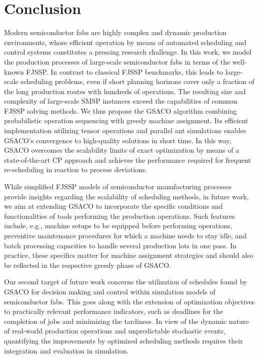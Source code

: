 \documentclass[runningheads]{llncs}
\begin{document}
\section{Conclusion}
\label{sec:conclusion}

Modern semiconductor fabs are highly complex and dynamic production
environments, whose efficient operation by means of automated scheduling
and control systems constitutes a pressing research challenge.
In this work, we model the production processes of large-scale
semiconductor fabs in terms of the well-known FJSSP.
In contrast to classical FJSSP benchmarks,
this leads to large-scale scheduling problems,
even if short planning horizons cover only a fraction of the long
production routes with hundreds of operations.
The resulting size and complexity of large-scale SMSP instances
exceed the capabilities of common FJSSP solving methods.
We thus propose the GSACO algorithm combining probabilistic
operation sequencing with greedy machine assignment.
Its efficient implementation utilizing tensor operations and
parallel ant simulations enables GSACO's convergence to high-quality
solutions in short time.
In this way, GSACO overcomes the scalability limits of
exact optimization by means of a state-of-the-art CP approach
and achieves the performance required for frequent re-scheduling
in reaction to process deviations. %


While simplified FJSSP models of semiconductor manufacturing processes
provide insights regarding the scalability of scheduling methods,
in future work, we aim at extending GSACO to incorporate the specific
conditions and functionalities of tools performing the production operations.
Such features include, e.g.,
machine setups to be equipped before performing operations,
preventive maintenance procedures for which a machine needs to stay idle, and
batch processing capacities to handle several production lots in one pass.
In practice, these specifics matter for machine assignment strategies
and should also be reflected in the respective greedy phase of GSACO.

Our second target of future work concerns the utilization of schedules 
found by GSACO for decision making and control within simulation models
of semiconductor fabs.
This goes along with the extension of optimization objectives to
practically relevant performance indicators, such as deadlines for the
completion of jobs and minimizing the tardiness.
In view of the dynamic nature of real-world production operations and
unpredictable stochastic events,
quantifying the improvements by optimized scheduling methods
requires their integration and evaluation in simulation.
\end{document}
